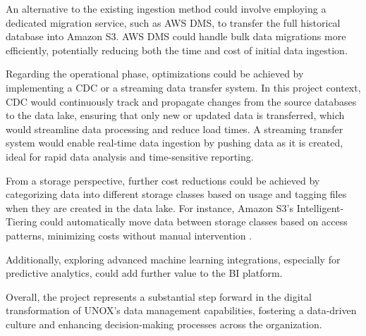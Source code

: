 An alternative to the existing ingestion method could involve employing a dedicated migration service, such as \ac{AWS} \ac{DMS}, to transfer the full historical database into Amazon \ac{S3}. \ac{AWS} \ac{DMS} could handle bulk data migrations more efficiently, potentially reducing both the time and cost of initial data ingestion.

Regarding the operational phase, optimizations could be achieved by implementing a \ac{CDC} or a streaming data transfer system. In this project context, \ac{CDC} would continuously track and propagate changes from the source databases to the data lake, ensuring that only new or updated data is transferred, which would streamline data processing and reduce load times. A streaming transfer system would enable real-time data ingestion by pushing data as it is created, ideal for rapid data analysis and time-sensitive reporting.

From a storage perspective, further cost reductions could be achieved by categorizing data into different storage classes based on usage and tagging files when they are created in the data lake. For instance, Amazon \ac{S3}'s Intelligent-Tiering could automatically move data between storage classes based on access patterns, minimizing costs without manual intervention \cite{s3lifecycles}.

Additionally, exploring advanced machine learning integrations, especially for predictive analytics, could add further value to the \ac{BI} platform. 

Overall, the project represents a substantial step forward in the digital transformation of UNOX's data management capabilities, fostering a data-driven culture and enhancing decision-making processes across the organization.